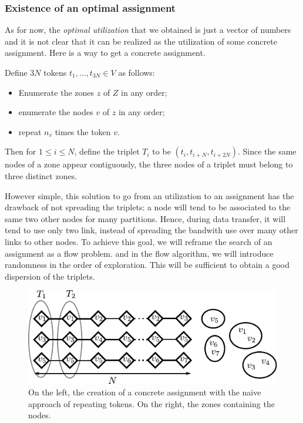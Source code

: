 \documentclass[]{article}
\begin{document}
\subsubsection*{Existence of an optimal assignment}

As for now, the \emph{optimal utilization} that we obtained is just a vector of numbers and it is not clear that it can be realized as the utilization of some concrete assignment. Here is a way to get a concrete assignment.

Define $3N$ tokens $t_1,\ldots, t_{3N}\in V$ as follows:
\begin{itemize}
	\item Enumerate the zones $z$ of $Z$ in any order;
	\item enumerate the nodes $v$ of $z$ in any order;
	\item repeat $n_v$ times the token $v$.
\end{itemize} 
Then for $1\le i \le N$, define the triplet $T_i$ to be 
$(t_i, t_{i+N}, t_{i+2N})$. Since the same nodes of a zone appear contiguously, the three nodes of a triplet must belong to three distinct zones.

However simple, this solution to go from an utilization to an assignment has the drawback of not spreading the triplets: a node will tend to be associated to the same two other nodes for many partitions. Hence, during data transfer, it will tend to use only two link, instead of spreading the bandwith use over many other links to other nodes. To achieve this goal, we will reframe the search of an assignment as a flow problem. and in the flow algorithm, we will introduce randomness in the order of exploration. This will be sufficient to obtain a good dispersion of the triplets.

\begin{figure}
	\centering
	\includegraphics[width=0.9\linewidth]{figures/naive}
	\caption{On the left, the creation of a concrete assignment with the naive approach of repeating tokens. On the right, the zones containing the nodes.}
\end{figure}
\end{document}
